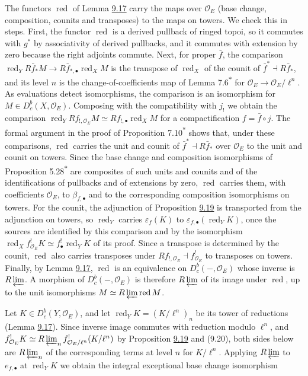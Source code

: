 \documentclass[11pt]{article}
\newcommand{\bpout}[1]{#1\textsuperscript{\hyperlink{bp-outside}{\ensuremath{\ast}}}}
\providecommand{\Dbc}{}\renewcommand{\Dbc}{D^b_c}
\begin{document}
The functors \(\operatorname{red}\) of Lemma \hyperref[bp55]{9.17} carry the maps over \(\mathcal O_E\) (base change, composition, counits and transposes) to the maps on towers. We check this in steps. First, the functor \(\operatorname{red}\) is a derived pullback of ringed topoi, so it commutes with \(g^*\) by associativity of derived pullbacks, and it commutes with extension by zero because the right adjoints commute. Next, for proper \(\bar f\), the comparison \(\operatorname{red}_YR\bar f_*M\to R\bar f_{*,\bullet}\operatorname{red}_XM\) is the transpose of \(\operatorname{red}_X\) of the counit of \(\bar f^*\dashv R\bar f_*\), and its level \(n\) is the change-of-coefficients map of Lemma \bpout{7.6} for \(\mathcal O_E\to\mathcal O_E/\ell^n\). As evaluations detect isomorphisms, the comparison is an isomorphism for \(M\in\Dbc(X,\mathcal O_E)\). Composing with the compatibility with \(j_!\) we obtain the comparison \(\operatorname{red}_YRf_{!,\mathcal O_E}M\simeq Rf_{!,\bullet}\operatorname{red}_XM\) for a compactification \(f=\bar f\circ j\). The formal argument in the proof of Proposition \bpout{7.10} shows that, under these comparisons, \(\operatorname{red}\) carries the unit and counit of \(\bar f^*\dashv R\bar f_*\) over \(\mathcal O_E\) to the unit and counit on towers. Since the base change and composition isomorphisms of Proposition \bpout{5.28} are composites of such units and counits and of the identifications of pullbacks and of extensions by zero, \(\operatorname{red}\) carries them, with coefficients \(\mathcal O_E\), to \(\beta_{f,\bullet}\) and to the corresponding composition isomorphisms on towers. For the counit, the adjunction of Proposition \hyperref[bp61]{9.19} is transported from the adjunction on towers, so \(\operatorname{red}_Y\) carries \(\varepsilon_f(K)\) to \(\varepsilon_{f,\bullet}(\operatorname{red}_YK)\), once the sources are identified by this comparison and by the isomorphism \(\operatorname{red}_Xf^!_{\mathcal O_E}K\simeq f^!_\bullet\operatorname{red}_YK\) of its proof. Since a transpose is determined by the counit, \(\operatorname{red}\) also carries transposes under \(Rf_{!,\mathcal O_E}\dashv f^!_{\mathcal O_E}\) to transposes on towers. Finally, by Lemma \hyperref[bp55]{9.17}, \(\operatorname{red}\) is an equivalence on \(\Dbc(-,\mathcal O_E)\) whose inverse is \(R\varprojlim\). A morphism of \(\Dbc(-,\mathcal O_E)\) is therefore \(R\varprojlim\) of its image under \(\operatorname{red}\), up to the unit isomorphisms \(M\simeq R\varprojlim\operatorname{red}M\).

Let \(K\in\Dbc(Y,\mathcal O_E)\), and let \(\operatorname{red}_YK=(K/\ell^n)_n\) be its tower of reductions (Lemma \hyperref[bp55]{9.17}). Since inverse image commutes with reduction modulo \(\ell^n\), and \(f_{\mathcal O_E}^!K\simeq R\varprojlim_nf_{\mathcal O_E/\ell^n}^!(K/\ell^n)\) by Proposition \hyperref[bp61]{9.19} and (9.20), both sides below are \(R\varprojlim_n\) of the corresponding terms at level \(n\) for \(K/\ell^n\). Applying \(R\varprojlim\) to \(e_{f,\bullet}\) at \(\operatorname{red}_YK\) we obtain the integral exceptional base change isomorphism
\end{document}
